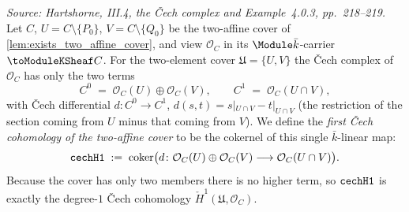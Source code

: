 \begin{definition}
  \label{def:cech_H1_two_affine}
  \textit{Source: Hartshorne, III.4, the Čech complex and
  Example~4.0.3, pp.~218--219.}
  Let \(C\), \(U = C \setminus \{P_0\}\), \(V = C \setminus \{Q_0\}\) be
  the two-affine cover of \cref{lem:exists_two_affine_cover}, and view
  \(\mathcal O_C\) in its \(\Module \bar k\)-carrier \(\toModuleKSheaf
  C\). For the two-element cover \(\mathfrak U = \{U, V\}\) the Čech
  complex of \(\mathcal O_C\) has only the two terms
  \[
    C^0 \;=\; \mathcal O_C(U) \oplus \mathcal O_C(V), \qquad
    C^1 \;=\; \mathcal O_C(U \cap V),
  \]
  with Čech differential
  \(d \colon C^0 \to C^1\),
  \(d(s, t) = s|_{U \cap V} - t|_{U \cap V}\) (the restriction of the
  section coming from \(U\) minus that coming from \(V\)). We define the
  \emph{first Čech cohomology of the two-affine cover} to be the
  cokernel of this single \(\bar k\)-linear map:
  \[
    \mathtt{cechH1} \;:=\;
    \operatorname{coker}\bigl(d \colon \mathcal O_C(U) \oplus
      \mathcal O_C(V) \longrightarrow \mathcal O_C(U \cap V)\bigr).
  \]
  Because the cover has only two members there is no higher term, so
  \(\mathtt{cechH1}\) is exactly the degree-\(1\) Čech cohomology
  \(\check H^1(\mathfrak U, \mathcal O_C)\).
\end{definition}

